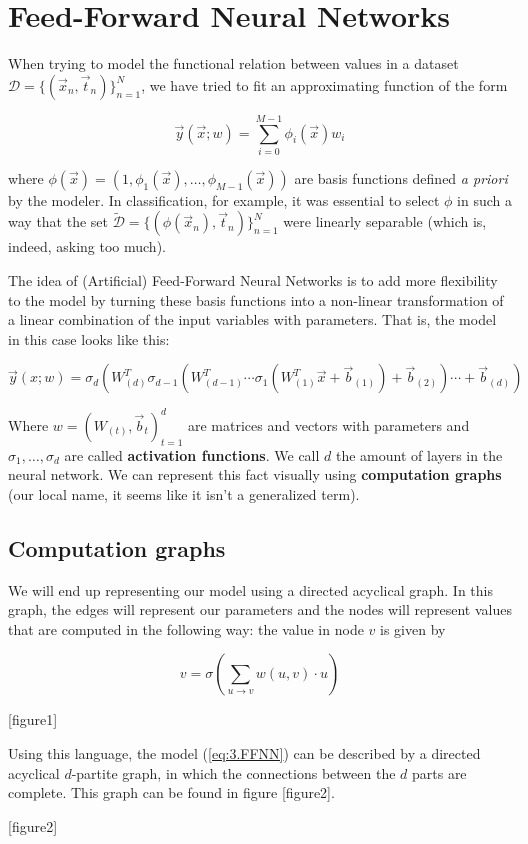 
\chapter{Feed-Forward Neural Networks}

When trying to model the functional relation between values in a dataset $\mathcal{D} = \{(\vec{x}_n, \vec{t}_n)\}_{n=1}^N$, we have tried to fit an approximating function of the form

\[\vec{y}(\vec{x};w) = \sum_{i=0}^{M-1}\phi_i(\vec{x})w_i\]

where $\phi(\vec{x}) = (1, \phi_1(\vec{x}), \dots, \phi_{M-1}(\vec{x}))$ are basis functions defined \textit{a priori} by the modeler. In classification, for example, it was essential to select $\phi$ in such a way that the set $\widetilde{\mathcal{D}} = \{(\phi(\vec{x}_n), \vec{t}_n)\}_{n=1}^N$ were linearly separable (which is, indeed, asking too much).

The idea of (Artificial) Feed-Forward Neural Networks is to add more flexibility to the model by turning these basis functions into a non-linear transformation of a linear combination of the input variables with parameters. That is, the model in this case looks like this:

\begin{equation}\label{eq:3.FFNN}
\vec{y}(x;w) = \sigma_{d}\left(W^T_{(d)}\sigma_{d-1}(W^T_{(d-1)}\cdots\sigma_1(W^T_{(1)}\vec{x} + \vec{b}_{(1)})+\vec{b}_{(2)})\cdots+\vec{b}_{(d)}\right)
\end{equation}

Where $w = (W_{(t)}, \vec{b}_{t})_{t=1}^d$ are matrices and vectors with parameters and $\sigma_1,\dots,\sigma_d$ are called \textbf{activation functions}. We call $d$ the amount of layers in the neural network. We can represent this fact visually using \textbf{computation graphs} (our local name, it seems like it isn't a generalized term).

\section{Computation graphs}

We will end up representing our model using a directed acyclical graph. In this graph, the edges will represent our parameters and the nodes will represent values that are computed in the following way: the value in node $v$ is given by

\[v = \sigma\left(\sum_{u\to v}w(u,v)\cdot u\right)\]

[figure1]

Using this language, the model (\ref{eq:3.FFNN}) can be described by a directed acyclical $d$-partite graph, in which the connections between the $d$ parts are complete. This graph can be found in figure [figure2]. 

[figure2]